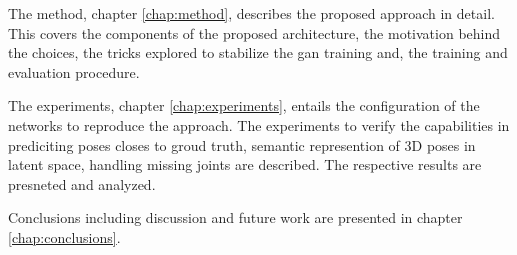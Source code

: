 The method, chapter \ref{chap:method}, describes the proposed approach in detail. This covers the components of the proposed architecture, the motivation behind the choices, the tricks explored to stabilize the \ac{gan} training and, the training and evaluation procedure.

The experiments, chapter \ref{chap:experiments}, entails the configuration of the networks to reproduce the approach. The experiments to verify the capabilities in prediciting poses closes to groud truth, semantic represention of 3D poses in latent space, handling missing joints are described. The respective results are presneted and analyzed.  

Conclusions including discussion and future work are presented in chapter \ref{chap:conclusions}.


